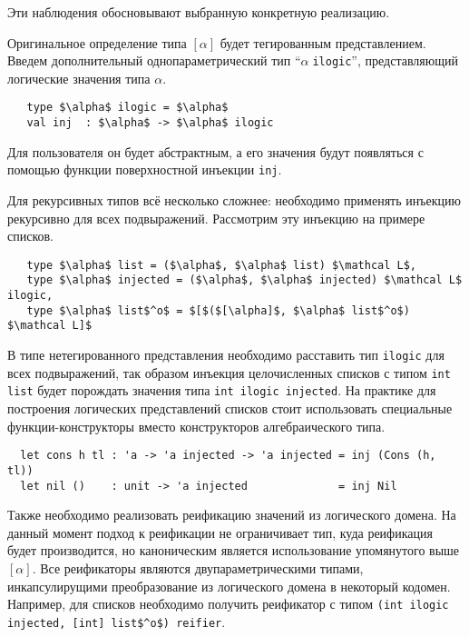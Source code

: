 Эти наблюдения обосновывают выбранную конкретную реализацию.

Оригинальное определение типа $[\alpha]$ будет тегированным представлением.
Введем дополнительный однопараметрический тип \enquote{$\alpha\;$\lstinline|ilogic|}, %
представляющий логические значения типа $\alpha$.


\begin{lstlisting}
   type $\alpha$ ilogic = $\alpha$
   val inj  : $\alpha$ -> $\alpha$ ilogic
\end{lstlisting}

\noindent Для пользователя он будет абстрактным, а его значения будут появляться с помощью функции поверхностной инъекции \lstinline=inj=.

Для рекурсивных типов всё несколько сложнее: необходимо применять инъекцию рекурсивно для всех подвыражений. Рассмотрим эту инъекцию на примере списков.

\begin{lstlisting}
   type $\alpha$ list = ($\alpha$, $\alpha$ list) $\mathcal L$,
   type $\alpha$ injected = ($\alpha$, $\alpha$ injected) $\mathcal L$ ilogic,
   type $\alpha$ list$^o$ = $[$($[\alpha]$, $\alpha$ list$^o$) $\mathcal L]$
\end{lstlisting}

\noindent В типе нетегированного представления необходимо расставить тип \lstinline=ilogic= для всех подвыражений, так образом инъекция целочисленных списков с типом \lstinline=int list= будет порождать значения типа \lstinline=int ilogic injected=.
На практике для построения логических представлений списков стоит использовать специальные функции-конструкторы вместо конструкторов алгебраического типа.
\begin{lstlisting}
  let cons h tl : 'a -> 'a injected -> 'a injected = inj (Cons (h, tl))
  let nil ()    : unit -> 'a injected              = inj Nil
\end{lstlisting}

Также необходимо реализовать реификацию значений из логического домена.
На данный момент подход к реификации не ограничивает тип, куда реификация будет производится, но каноническим является использование упомянутого выше $[\alpha]$.
Все реификаторы являются двупараметрическими типами, инкапсулирущими преобразование из логического домена в некоторый кодомен.
Например, для списков необходимо получить реификатор с типом \lstinline=(int ilogic injected, [int] list$^o$) reifier=.


